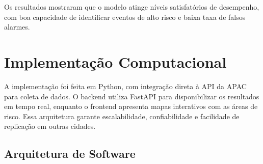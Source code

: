 Os resultados mostraram que o modelo atinge níveis satisfatórios de desempenho, com boa capacidade de identificar eventos de alto risco e baixa taxa de falsos alarmes.

\section{Implementação Computacional}

A implementação foi feita em Python, com integração direta à API da APAC para coleta de dados. O backend utiliza FastAPI para disponibilizar os resultados em tempo real, enquanto o frontend apresenta mapas interativos com as áreas de risco. Essa arquitetura garante escalabilidade, confiabilidade e facilidade de replicação em outras cidades.

\subsection{Arquitetura de Software}

